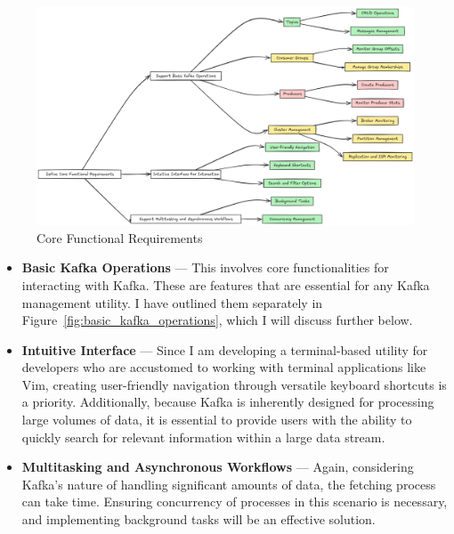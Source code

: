 \documentclass[10pt , a4paper]{report}
\begin{document}
\begin{figure}[htbp]
    \centering
    \includegraphics[width=1\linewidth]{imgs/CoreFucntionalRequirementsDiagram.png}
    \caption{Core Functional Requirements}
    \label{fig:core_functional_requirements}
\end{figure}

\begin{itemize}
    \item \textbf{Basic Kafka Operations} — This involves core functionalities for interacting with Kafka. These are features that are essential for any Kafka management utility. I have outlined them separately in Figure~\ref{fig:basic_kafka_operations}, which I will discuss further below.
    
    \item \textbf{Intuitive Interface} — Since I am developing a terminal-based utility for developers who are accustomed to working with terminal applications like Vim, creating user-friendly navigation through versatile keyboard shortcuts is a priority. Additionally, because Kafka is inherently designed for processing large volumes of data, it is essential to provide users with the ability to quickly search for relevant information within a large data stream.
    
    \item \textbf{Multitasking and Asynchronous Workflows} — Again, considering Kafka’s nature of handling significant amounts of data, the fetching process can take time. Ensuring concurrency of processes in this scenario is necessary, and implementing background tasks will be an effective solution.
\end{itemize}
\end{document}

